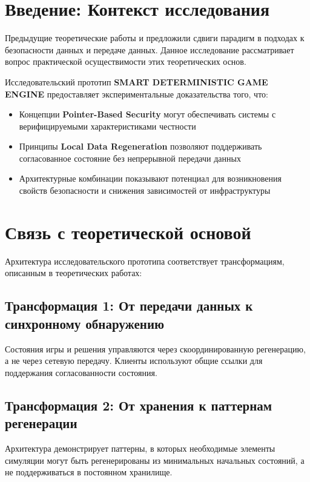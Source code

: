 \documentclass[14pt, a4paper]{extarticle}
\begin{document}
\section{Введение: Контекст исследования}

Предыдущие теоретические работы \cite{suvorov2025pointer} и \cite{suvorov2025local} предложили сдвиги парадигм в подходах к безопасности данных и передаче данных. Данное исследование рассматривает вопрос практической осуществимости этих теоретических основ.

Исследовательский прототип \textbf{SMART DETERMINISTIC GAME ENGINE} предоставляет экспериментальные доказательства того, что:
\begin{itemize}
    \item Концепции \textbf{Pointer-Based Security} могут обеспечивать системы с верифицируемыми характеристиками честности
    \item Принципы \textbf{Local Data Regeneration} позволяют поддерживать согласованное состояние без непрерывной передачи данных
    \item Архитектурные комбинации показывают потенциал для возникновения свойств безопасности и снижения зависимостей от инфраструктуры
\end{itemize}

\section{Связь с теоретической основой}

Архитектура исследовательского прототипа соответствует трансформациям, описанным в теоретических работах:

\subsection{Трансформация 1: От передачи данных к синхронному обнаружению}
Состояния игры и решения управляются через скоординированную регенерацию, а не через сетевую передачу. Клиенты используют общие ссылки для поддержания согласованности состояния.

\subsection{Трансформация 2: От хранения к паттернам регенерации}
Архитектура демонстрирует паттерны, в которых необходимые элементы симуляции могут быть регенерированы из минимальных начальных состояний, а не поддерживаться в постоянном хранилище.
\end{document}
